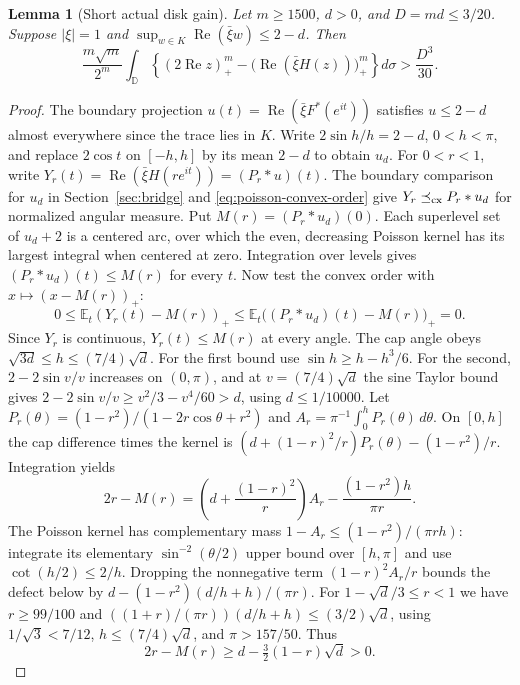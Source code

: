 \documentclass[11pt]{article}
\newtheorem{lemma}[theorem]{Lemma}
\newcommand{\D}{\mathbb D}
\newcommand{\E}{\mathbb E}
\begin{document}
	\begin{lemma}[Short actual disk gain]\label{lem:actual-disk-gain}
		Let $m\geq1500$, $d>0$, and $D=md\leq3/20$. Suppose $|\xi|=1$ and
		$\sup_{w\in K}\operatorname{Re}(\bar\xi w)\leq 2-d$. Then
		\[
		\frac{m\sqrt m}{2^m}\int_{\D}
		\left\{(2\operatorname{Re}z)_+^m
		-\bigl(\operatorname{Re}(\bar\xi H(z))\bigr)_+^m\right\}d\sigma
		>\frac{D^3}{30}.
		\]
		
	\end{lemma}
	\begin{proof}
		The boundary projection $u(t)=\operatorname{Re}(\bar\xi F^*(e^{it}))$
		satisfies $u\leq2-d$ almost everywhere since the trace lies in $K$.
		Write $2\sin h/h=2-d$, $0<h<\pi$, and replace $2\cos t$ on $[-h,h]$
		by its mean $2-d$ to obtain $u_d$. For $0<r<1$, write
		$Y_r(t)=\operatorname{Re}(\bar\xi H(re^{it}))=(P_r*u)(t)$.
		The boundary comparison for $u_d$ in Section~\ref{sec:bridge} and
		\eqref{eq:poisson-convex-order} give
		$Y_r\preceq_{\rm cx}P_r*u_d$ for normalized angular measure.
		Put $M(r)=(P_r*u_d)(0)$. Each superlevel set of $u_d+2$ is a centered
		arc, over which the even, decreasing Poisson kernel has its largest
		integral when centered at zero. Integration over levels gives
		$(P_r*u_d)(t)\leq M(r)$ for every $t$.
		Now test the convex order with $x\mapsto(x-M(r))_+$:
		\[
		0\leq \E_t (Y_r(t)-M(r))_+
		\leq \E_t\bigl((P_r*u_d)(t)-M(r)\bigr)_+=0 .
		\]
		Since $Y_r$ is continuous, $Y_r(t)\leq M(r)$ at every angle.
		The cap angle obeys $\sqrt{3d}\leq h\leq(7/4)\sqrt d$.
		For the first bound use $\sin h\geq h-h^3/6$. For the second,
		$2-2\sin v/v$ increases on $(0,\pi)$, and at $v=(7/4)\sqrt d$
		the sine Taylor bound gives $2-2\sin v/v\geq v^2/3-v^4/60>d$,
		using $d\leq1/10000$.
		Let $P_r(\theta)=(1-r^2)/(1-2r\cos\theta+r^2)$ and
		$A_r=\pi^{-1}\int_0^hP_r(\theta)\,d\theta$.
		On $[0,h]$ the cap difference times the kernel is
		$(d+(1-r)^2/r)P_r(\theta)-(1-r^2)/r$. Integration yields
		\[
		2r-M(r)=\left(d+\frac{(1-r)^2}{r}\right)A_r
		-\frac{(1-r^2)h}{\pi r}.
		\]
		The Poisson kernel has complementary mass
		$1-A_r\leq(1-r^2)/(\pi r h)$: integrate its elementary
		$\sin^{-2}(\theta/2)$ upper bound over $[h,\pi]$ and use
		$\cot(h/2)\leq2/h$. Dropping the nonnegative term
		$(1-r)^2A_r/r$ bounds the defect below by
		$d-(1-r^2)(d/h+h)/(\pi r)$. For $1-\sqrt d/3\leq r<1$
		we have $r\geq99/100$ and
		$((1+r)/(\pi r))(d/h+h)\leq(3/2)\sqrt d$, using
		$1/\sqrt3<7/12$, $h\leq(7/4)\sqrt d$, and $\pi>157/50$.
		Thus
		\begin{equation}\label{eq:short-peak-defect}
			2r-M(r)\geq d-\tfrac32(1-r)\sqrt d>0.
		\end{equation}
		

\end{proof}
\end{document}
